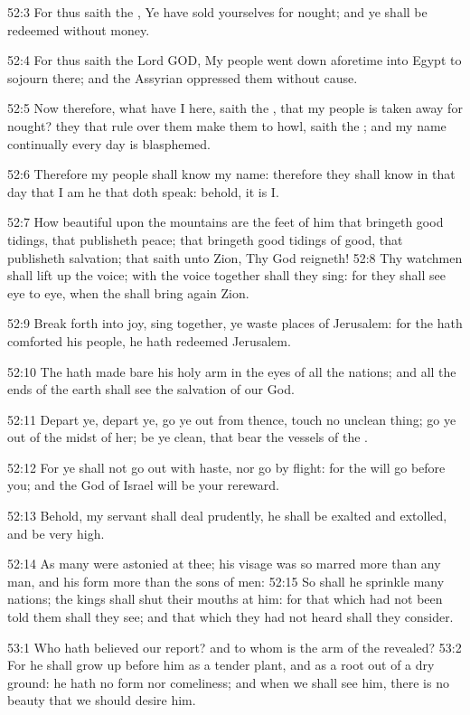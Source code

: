 52:3 For thus saith the \LORD, Ye have sold yourselves for nought; and
ye shall be redeemed without money.

52:4 For thus saith the Lord GOD, My people went down aforetime into
Egypt to sojourn there; and the Assyrian oppressed them without cause.

52:5 Now therefore, what have I here, saith the \LORD, that my people
is taken away for nought? they that rule over them make them to howl,
saith the \LORD; and my name continually every day is blasphemed.

52:6 Therefore my people shall know my name: therefore they shall know
in that day that I am he that doth speak: behold, it is I.

52:7 How beautiful upon the mountains are the feet of him that
bringeth good tidings, that publisheth peace; that bringeth good
tidings of good, that publisheth salvation; that saith unto Zion, Thy
God reigneth!  52:8 Thy watchmen shall lift up the voice; with the
voice together shall they sing: for they shall see eye to eye, when
the \LORD shall bring again Zion.

52:9 Break forth into joy, sing together, ye waste places of
Jerusalem: for the \LORD hath comforted his people, he hath redeemed
Jerusalem.

52:10 The \LORD hath made bare his holy arm in the eyes of all the
nations; and all the ends of the earth shall see the salvation of our
God.

52:11 Depart ye, depart ye, go ye out from thence, touch no unclean
thing; go ye out of the midst of her; be ye clean, that bear the
vessels of the \LORD.

52:12 For ye shall not go out with haste, nor go by flight: for the
\LORD will go before you; and the God of Israel will be your rereward.

52:13 Behold, my servant shall deal prudently, he shall be exalted and
extolled, and be very high.

52:14 As many were astonied at thee; his visage was so marred more
than any man, and his form more than the sons of men: 52:15 So shall
he sprinkle many nations; the kings shall shut their mouths at him:
for that which had not been told them shall they see; and that which
they had not heard shall they consider.

53:1 Who hath believed our report? and to whom is the arm of the \LORD
revealed?  53:2 For he shall grow up before him as a tender plant, and
as a root out of a dry ground: he hath no form nor comeliness; and
when we shall see him, there is no beauty that we should desire him.

